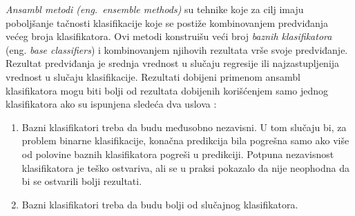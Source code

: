 \documentclass[12pt,oneside]{memoir}
\begin{document}
\textit{Ansambl metodi (eng.~ensemble methods)} su tehnike koje za cilj imaju poboljšanje tačnosti klasifikacije koje se postiže kombinovanjem predviđanja većeg broja klasifikatora. Ovi metodi konstruišu veći broj \textit{baznih klasifikatora} (eng.\textit{ base classifiers}) i kombinovanjem njihovih rezultata vrše svoje predviđanje. Rezultat predviđanja je srednja vrednost u slučaju regresije ili najzastupljenija vrednost u slučaju klasifikacije. Rezultati dobijeni primenom ansambl klasifikatora mogu biti bolji od rezultata dobijenih korišćenjem samo jednog klasifikatora ako su ispunjena sledeća dva uslova \cite{mitic}:
\begin{enumerate}[1)]
\item Bazni klasifikatori treba da budu međusobno nezavisni. 
U tom slučaju bi, za problem binarne klasifikacije, konačna predikcija bila pogrešna samo ako više od polovine baznih klasifikatora pogreši u predikciji. Potpuna nezavisnost klasifikatora je teško ostvariva, ali se u praksi pokazalo da nije neophodna da bi se ostvarili bolji rezultati. 
\item Bazni klasifikatori treba da budu bolji od slučajnog klasifikatora.
\end{enumerate}
\end{document}
